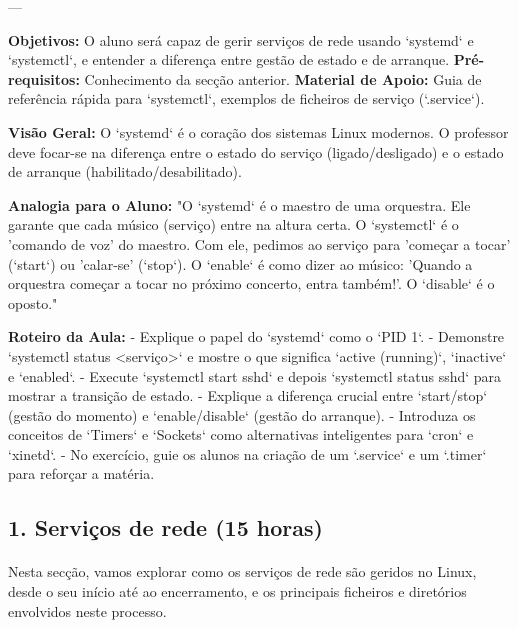 \documentclass[10pt,a4paper]{article}
\newcommand{\guia}[1]{%
	\begin{tcolorbox}[
		colback=lightgray,
		colframe=darkblue,
		boxrule=1pt,
		arc=4mm,
		title=\textbf{Guia do Formador},
		fonttitle=\bfseries,
		coltitle=darkblue,
		boxsep=5pt,
		left=5mm, right=5mm, top=3mm, bottom=3mm
		]
		#1
	\end{tcolorbox}
}
\begin{document}
	---
	
	\guia{
		\textbf{Objetivos:} O aluno será capaz de gerir serviços de rede usando `systemd` e `systemctl`, e entender a diferença entre gestão de estado e de arranque.
		\textbf{Pré-requisitos:} Conhecimento da secção anterior.
		\textbf{Material de Apoio:} Guia de referência rápida para `systemctl`, exemplos de ficheiros de serviço (`.service`).
		
		\textbf{Visão Geral:} O `systemd` é o coração dos sistemas Linux modernos. O professor deve focar-se na diferença entre o estado do serviço (ligado/desligado) e o estado de arranque (habilitado/desabilitado).
		
		\textbf{Analogia para o Aluno:} "O `systemd` é o maestro de uma orquestra. Ele garante que cada músico (serviço) entre na altura certa. O `systemctl` é o 'comando de voz' do maestro. Com ele, pedimos ao serviço para 'começar a tocar' (`start`) ou 'calar-se' (`stop`). O `enable` é como dizer ao músico: 'Quando a orquestra começar a tocar no próximo concerto, entra também!'. O `disable` é o oposto."
		
		\textbf{Roteiro da Aula:}
		- Explique o papel do `systemd` como o `PID 1`.
		- Demonstre `systemctl status <serviço>` e mostre o que significa `active (running)`, `inactive` e `enabled`.
		- Execute `systemctl start sshd` e depois `systemctl status sshd` para mostrar a transição de estado.
		- Explique a diferença crucial entre `start/stop` (gestão do momento) e `enable/disable` (gestão do arranque).
		- Introduza os conceitos de `Timers` e `Sockets` como alternativas inteligentes para `cron` e `xinetd`.
		- No exercício, guie os alunos na criação de um `.service` e um `.timer` para reforçar a matéria.
	}
	\subsection*{1. Serviços de rede (15 horas)}
	\vspace{-1em}
	\paragraph{}
	Nesta secção, vamos explorar como os serviços de rede são geridos no Linux, desde o seu início até ao encerramento, e os principais ficheiros e diretórios envolvidos neste processo.
	
\end{document}
